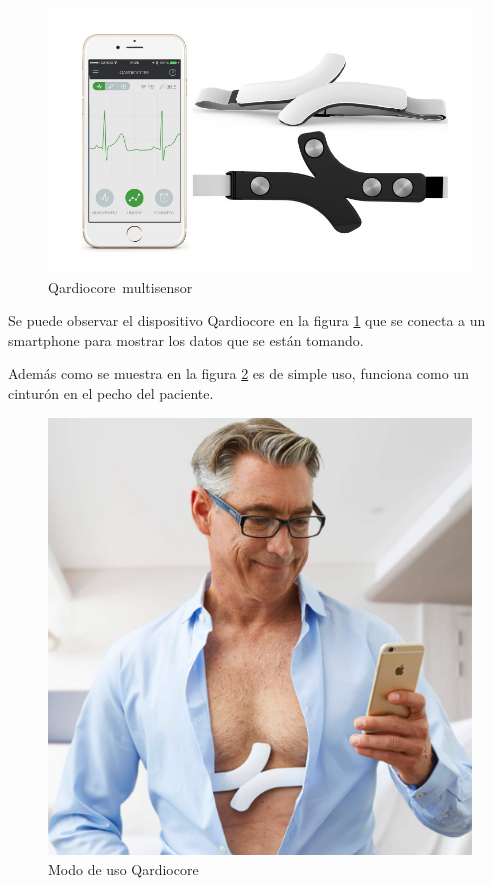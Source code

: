 \begin{figure}[H]
	\centering
	\includegraphics[scale=0.5]{figuras/estadoarte/qardio/qardio.jpg}
	\caption{Qardiocore\textregistered\ multisensor}
	\label{qardio1}
\end{figure}

Se puede observar el dispositivo Qardiocore en la figura \ref{qardio1} que se conecta a un smartphone para mostrar los datos que se están tomando.

\newpage
Además como se muestra en la figura \ref{qardio2} es de simple uso, funciona como un cinturón en el pecho del paciente.

\begin{figure}[H]
	\centering
	\includegraphics[scale=0.5]{figuras/estadoarte/qardio/wear.png}
	\caption{Modo de uso Qardiocore}
	\label{qardio2}
\end{figure}

